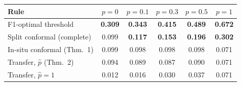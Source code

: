 \setlength{\tabcolsep}{3pt}
\begin{tabular}{lccccc}
\toprule
Rule & $p=0$ & $p=0.1$ & $p=0.3$ & $p=0.5$ & $p=1$ \\
\midrule
F1-optimal threshold & \textbf{0.309} & \textbf{0.343} & \textbf{0.415} & \textbf{0.489} & \textbf{0.672} \\
Split conformal (complete) & 0.099 & \textbf{0.117} & \textbf{0.153} & \textbf{0.196} & \textbf{0.302} \\
In-situ conformal (Thm.~1) & 0.099 & 0.098 & 0.098 & 0.098 & 0.071 \\
Transfer, $\hat p$ (Thm.~2) & 0.094 & 0.089 & 0.087 & 0.090 & 0.071 \\
Transfer, $\hat p=1$ & 0.012 & 0.016 & 0.030 & 0.037 & 0.071 \\
\bottomrule
\end{tabular}
